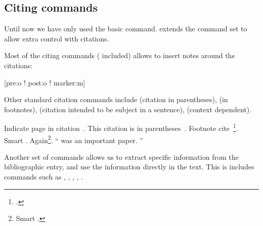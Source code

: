 \begin{example}[standalone,
  biber,
  paperwidth=7cm,
  paperheight=3cm,
]
\usepackage[
  maxnames=4,
]{biblatex}

\sloppy

\nocite{lshort}
\printbibliography[heading=none]


\end{example}

\begin{example}[standalone,
  biber,
  paperwidth=7cm,
  paperheight=3cm,
]
\usepackage[
  minnames=2,
]{biblatex}

\sloppy

\nocite{lshort}
\printbibliography[heading=none]


\end{example}

\subsection{Citing commands}

Until now we have only used the basic  command.  extends
the command set to allow extra control with
citations.

Most of the citing commands ( included) allows to insert notes
around the citations:
\begin{lscommand}
  [pre:o ! post:o ! marker:m]
\end{lscommand}
Other standard citation commands include  (citation in
parentheses),  (in footnotes),  (citation intended to
be subject in a sentence),  (context dependent).

\begin{example}[standalone,
  biber,
  paperwidth=5cm,
  paperheight=5cm,
]
\usepackage[style=alphabetic]{biblatex}
\usepackage{csquotes}

\sloppy

Indicate page in
citation~\cite[25]{lshort}. 
This citation is in
parentheses~\parencite{curie}.
Footnote cite~\footcite{dream}.
Smart \smartcite[See][78]{lshort}.
Again\footnote{Smart
\smartcite[12--56]{dream}.}.
\enquote{\Textcite{curie}
  was an important paper.
}

\end{example}

Another set of commands allows us to extract specific information from
the bibliographic entry, and use the information directly in the text. This is includes commands such as ,
, , , .

